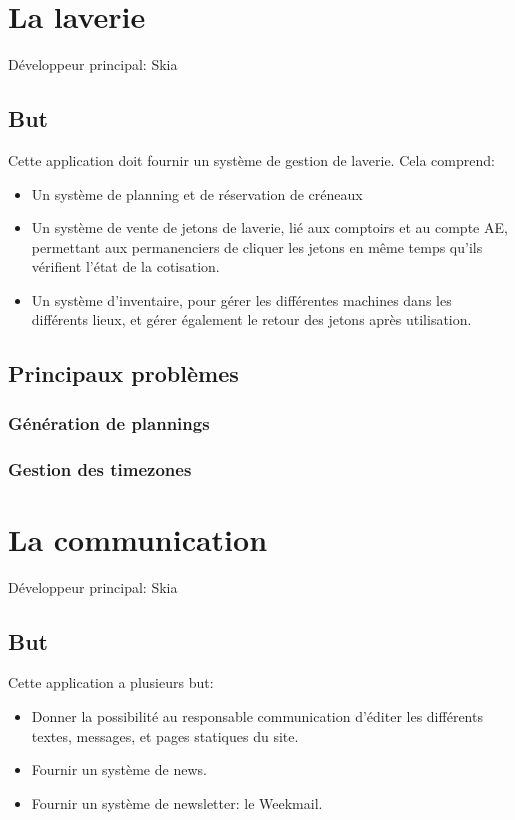 \documentclass[a4paper]{report}
\begin{document}
\chapter{La laverie}
\label{sec:la_laverie}
\par Développeur principal: Skia

\section{But}
\label{sub:but}
\par Cette application doit fournir un système de gestion de laverie. Cela comprend:
\begin{itemize}
    \item Un système de planning et de réservation de créneaux
    \item Un système de vente de jetons de laverie, lié aux comptoirs et au compte AE, permettant aux permanenciers de
        cliquer les jetons en même temps qu'ils vérifient l'état de la cotisation.
    \item Un système d'inventaire, pour gérer les différentes machines dans les différents lieux, et gérer également le
        retour des jetons après utilisation.
\end{itemize}

\section{Principaux problèmes}
\label{sec:principaux_problemes}

\subsection{Génération de plannings}
\label{sub:generation_de_plannings}

\subsection{Gestion des timezones}
\label{sub:gestion_des_timezones}


\chapter{La communication}
\label{sec:la_communication}
\par Développeur principal: Skia

\section{But}
\label{sub:but}
\par Cette application a plusieurs but:
\begin{itemize}
    \item Donner la possibilité au responsable communication d'éditer les différents textes, messages, et pages
        statiques du site.
    \item Fournir un système de news.
    \item Fournir un système de newsletter: le Weekmail.
\end{itemize}
\end{document}
